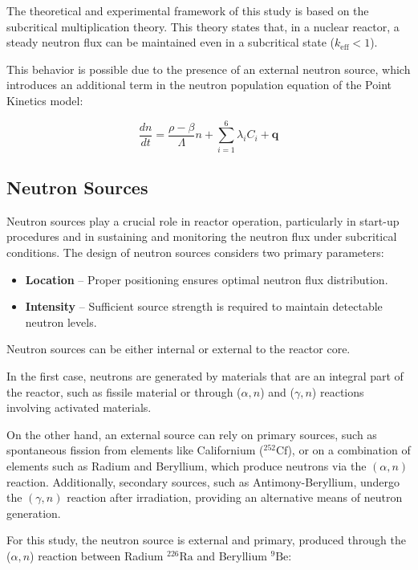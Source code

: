 The theoretical and experimental framework of this study is based on the subcritical multiplication theory. This theory states that, in a nuclear reactor, a steady neutron flux can be maintained even in a subcritical state ($ k_{\text{eff}} < 1 $). 

This behavior is possible due to the presence of an external neutron source, which introduces an additional term in the neutron population equation of the Point Kinetics model:

\begin{equation}
\frac{dn}{dt} = \frac{\rho - \beta}{\Lambda} n + \sum_{i=1}^{6} \lambda_i C_i + \mathbf{q}
\end{equation}

\subsection{Neutron Sources}

Neutron sources play a crucial role in reactor operation, particularly in start-up procedures and in sustaining and monitoring the neutron flux under subcritical conditions. The design of neutron sources considers two primary parameters:
\begin{itemize}
    \item \textbf{Location} – Proper positioning ensures optimal neutron flux distribution.
    \item \textbf{Intensity} – Sufficient source strength is required to maintain detectable neutron levels.
\end{itemize}

Neutron sources can be either internal or external to the reactor core. 

In the first case, neutrons are generated by materials that are an integral part of the reactor, such as fissile material or through ($\alpha, n$) and ($\gamma, n$) reactions involving activated materials. 

On the other hand, an external source can rely on primary sources, such as spontaneous fission from elements like Californium ($^{252}\text{Cf}$), or on a combination of elements such as Radium and Beryllium, which produce neutrons via the $(\alpha, n)$ reaction. Additionally, secondary sources, such as Antimony-Beryllium, undergo the $(\gamma, n)$ reaction after irradiation, providing an alternative means of neutron generation.

For this study, the neutron source is external and primary, produced through the ($\alpha, n$) reaction between Radium $^{226}\text{Ra}$ and Beryllium $^9\text{Be}$:

